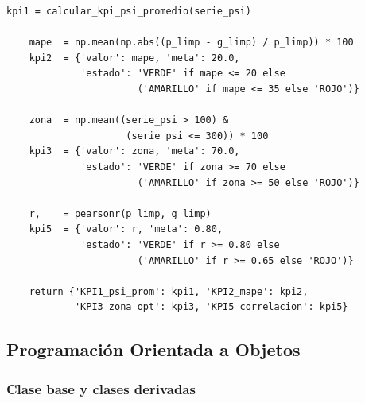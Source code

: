 \documentclass[12pt,a4paper]{article}
\begin{document}
\begin{lstlisting}[caption={Funciones para cálculo de indicadores, clasificación y consolidación de resultados.}, label=lst:funciones]
    kpi1 = calcular_kpi_psi_promedio(serie_psi)
    
    mape  = np.mean(np.abs((p_limp - g_limp) / p_limp)) * 100
    kpi2  = {'valor': mape, 'meta': 20.0,
             'estado': 'VERDE' if mape <= 20 else 
                       ('AMARILLO' if mape <= 35 else 'ROJO')}
    
    zona  = np.mean((serie_psi > 100) & 
                     (serie_psi <= 300)) * 100
    kpi3  = {'valor': zona, 'meta': 70.0,
             'estado': 'VERDE' if zona >= 70 else 
                       ('AMARILLO' if zona >= 50 else 'ROJO')}
    
    r, _  = pearsonr(p_limp, g_limp)
    kpi5  = {'valor': r, 'meta': 0.80,
             'estado': 'VERDE' if r >= 0.80 else 
                       ('AMARILLO' if r >= 0.65 else 'ROJO')}
    
    return {'KPI1_psi_prom': kpi1, 'KPI2_mape': kpi2,
            'KPI3_zona_opt': kpi3, 'KPI5_correlacion': kpi5}
\end{lstlisting}

\subsection{Programación Orientada a Objetos}

\subsubsection{Clase base y clases derivadas}
\end{document}
